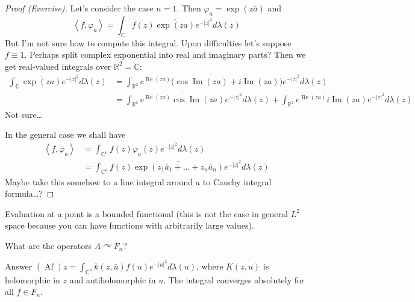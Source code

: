 \begin{proof}[Proof (Exercise)]\leavevmode
	Let's consider the case $n=1$. Then  $\varphi_a=\operatorname{exp}(z\bar{a})$ and
	\[\left<f,\varphi_a\right> =\int_{\mathbb{C}}f(z)\overline{\operatorname{exp}(za) }e^{-|z|^2}d \lambda(z)\]
		{\color{2}But I'm not sure how to compute this integral. Upon difficulties let's suppose $f\equiv1$. Perhaps split complex exponential into real and imaginary parts? Then we get real-valued integrals over $\mathbb{R}^{2}=\mathbb{C}$:}
		\begin{align*}
		\int_{\mathbb{C}}\overline{\operatorname{exp}(za)} e^{-|z|^2}d \lambda(z)&=\int_{\mathbb{R}^{2}}\overline{e^{\operatorname{Re}(za)}\big(\cos \operatorname{Im}(za)+i \operatorname{Im}(za)\big)}e^{-|z|^2}d \lambda(z)\\
										     &= \int_{\mathbb{R}^{2}}\overline{e^{\operatorname{Re}(za)}\cos \operatorname{Im}(za)}e^{-|z|^2}d \lambda(z)+\int_{\mathbb{R}^{2}}\overline{e^{\operatorname{Re}(za)}i \operatorname{Im}(za)}e^{-|z|^2}d \lambda(z)
			\end{align*}
{\color{2}Not sure…}

	In the general case we shall have
	\begin{align*}\left<f,\varphi_a\right> &=\int_{\mathbb{C}^n}f(z)\overline{\varphi_a(z)}e^{-|z|^2}d\lambda(z)\\
		&=\int_{\mathbb{C}^{n}}f(z)\overline{\operatorname{exp}(z_1\overline{a}_1+\ldots +z_n\overline{a}_n)}e^{-|z|^2}d \lambda(z)
		\end{align*}
{\color{2}Maybe take this somehow to a line integral around $a$ to Cauchy integral formula…?} \end{proof}
\clearpage
\begin{remark}\leavevmode
	Evaluation at a point is a bounded functional (this is not the case in general  $L^2$ space because you can have functions with arbitrarily large values).
\end{remark}

\begin{question}\leavevmode
	What are the operators $A\curvearrowright F_n$?
\end{question}

\begin{thing5}{Answer}\leavevmode
	$(\operatorname{Af})z=\int_{\mathbb{C}^{n}}k(z,\bar{u})f(u)e^{-|u|^2} d \lambda(u)$, where $K(z,u)$ is holomorphic in  $z$ and antiholomorphic in $u$. The integral converges absolutely for all $f \in F_n$.
\end{thing5}

